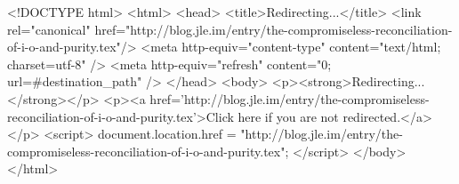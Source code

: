 <!DOCTYPE html>
<html>
<head>
<title>Redirecting...</title>
<link rel="canonical" href="http://blog.jle.im/entry/the-compromiseless-reconciliation-of-i-o-and-purity.tex"/>
<meta http-equiv="content-type" content="text/html; charset=utf-8" />
<meta http-equiv="refresh" content="0; url=#{destination_path}" />
</head>
<body>
  <p><strong>Redirecting...</strong></p>
  <p><a href='http://blog.jle.im/entry/the-compromiseless-reconciliation-of-i-o-and-purity.tex'>Click here if you are not redirected.</a></p>
  <script>
    document.location.href = "http://blog.jle.im/entry/the-compromiseless-reconciliation-of-i-o-and-purity.tex";
  </script>
</body>
</html>
